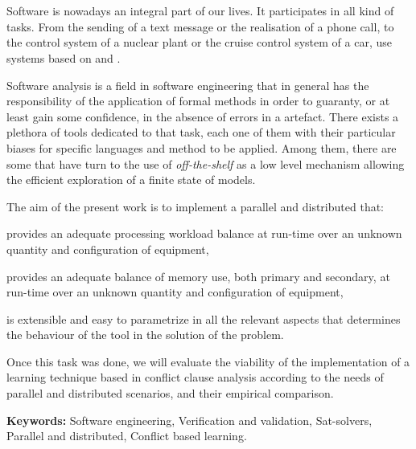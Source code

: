 
\chapter*{\runtitle}

Software is nowadays an integral part of our lives. It participates in all kind of tasks. From the sending of a text message or the realisation of a phone call, to the control system of a nuclear plant or the cruise control system of a car, use systems based on \hard and \soft.

Software analysis is a field in software engineering that in general has the responsibility of the application of formal methods in order to guaranty, or at least gain some confidence, in the absence of errors in a \soft artefact. There exists a plethora of tools dedicated to that task, each one of them with their particular biases for specific languages and method to be applied. Among them, there are some that have turn to the use of \ssolvers \emph{off-the-shelf}  as a low level mechanism allowing the efficient exploration of a finite state of models.
 
The aim of the present work is to implement a parallel and distributed \ssolver that:
\begin{inparaenum}[a)]  
\item provides an adequate processing workload balance at run-time over an unknown quantity and configuration of equipment,
\item provides an adequate balance of memory use, both primary and secondary, at run-time over an unknown quantity and configuration of equipment,
\item is extensible and easy to parametrize in all the relevant aspects that determines the behaviour of the tool in the solution of the problem.
\end{inparaenum}
Once this task was done, we will evaluate the viability of the implementation of a learning technique based in conflict clause analysis according to the needs of parallel and distributed scenarios, and their empirical comparison.

\bigskip

\noindent\textbf{Keywords:} Software engineering, Verification and validation, Sat-solvers, Parallel and distributed, Conflict based learning.